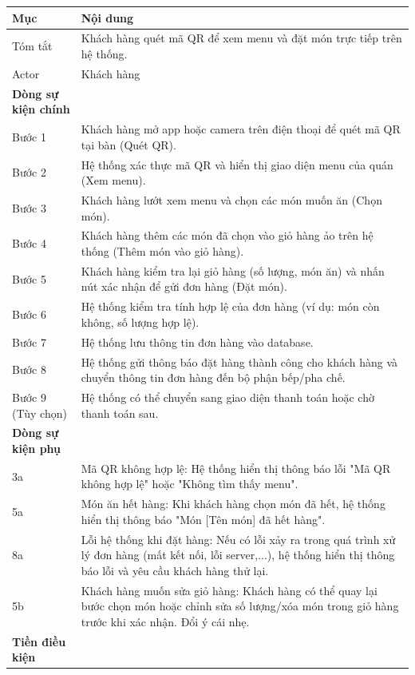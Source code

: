 \documentclass[a4paper]{article}
\begin{document}
\begin{table}[!htbp]
\centering
\begin{tabular}{|l|p{10cm}|}
\hline
Mục & Nội dung \\
\hline
Tóm tắt & Khách hàng quét mã QR để xem menu và đặt món trực tiếp trên hệ thống. \\
\hline
Actor & Khách hàng \\
\hline
\textbf{Dòng sự kiện chính} & \\
\hline
Bước 1 & Khách hàng mở app hoặc camera trên điện thoại để quét mã QR tại bàn (Quét QR). \\
\hline
Bước 2 & Hệ thống xác thực mã QR và hiển thị giao diện menu của quán (Xem menu). \\
\hline
Bước 3 & Khách hàng lướt xem menu và chọn các món muốn ăn (Chọn món).\\
\hline
Bước 4 & Khách hàng thêm các món đã chọn vào giỏ hàng ảo trên hệ thống (Thêm món vào giỏ hàng). \\
\hline
Bước 5 & Khách hàng kiểm tra lại giỏ hàng (số lượng, món ăn) và nhấn nút xác nhận để gửi đơn hàng (Đặt món). \\
\hline
Bước 6 & Hệ thống kiểm tra tính hợp lệ của đơn hàng (ví dụ: món còn không, số lượng hợp lệ). \\
\hline
Bước 7 & Hệ thống lưu thông tin đơn hàng vào database. \\
\hline
Bước 8 & Hệ thống gửi thông báo đặt hàng thành công cho khách hàng và chuyển thông tin đơn hàng đến bộ phận bếp/pha chế.\\
\hline
Bước 9 (Tùy chọn) & Hệ thống có thể chuyển sang giao diện thanh toán hoặc chờ thanh toán sau. \\
\hline
\textbf{Dòng sự kiện phụ} & \\
\hline
3a & Mã QR không hợp lệ: Hệ thống hiển thị thông báo lỗi "Mã QR không hợp lệ" hoặc "Không tìm thấy menu".\\
\hline
5a & Món ăn hết hàng: Khi khách hàng chọn món đã hết, hệ thống hiển thị thông báo "Món [Tên món] đã hết hàng". \\
\hline
8a & Lỗi hệ thống khi đặt hàng: Nếu có lỗi xảy ra trong quá trình xử lý đơn hàng (mất kết nối, lỗi server,...), hệ thống hiển thị thông báo lỗi và yêu cầu khách hàng thử lại. \\
\hline
5b & Khách hàng muốn sửa giỏ hàng: Khách hàng có thể quay lại bước chọn món hoặc chỉnh sửa số lượng/xóa món trong giỏ hàng trước khi xác nhận. Đổi ý cái nhẹ. \\
\hline
\textbf{Tiền điều kiện} & \\

\end{tabular}
\end{table}
\end{document}
